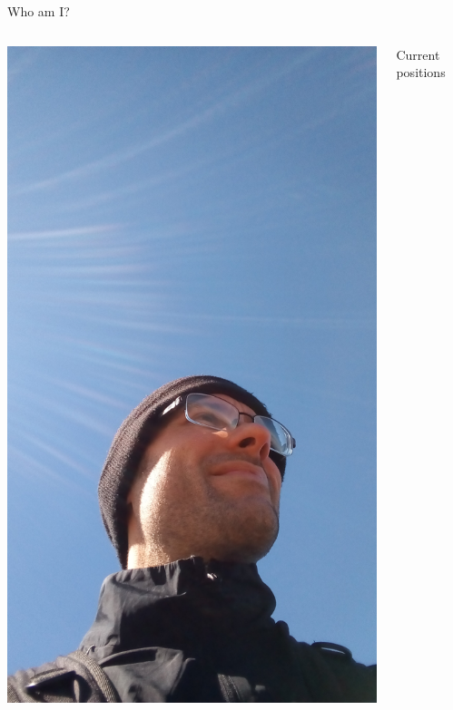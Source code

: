 \begin{frame}{Who am I?}
\begin{columns}
  
  \begin{column}{0.3\textwidth} 
\includegraphics[width=1.1\textwidth]{presentation/IMG_20180922_120515771.jpg}
    \end{column}
 
  \begin{column}{0.7\textwidth} 
Current positions


\end{column}
\end{columns}
\end{frame}
